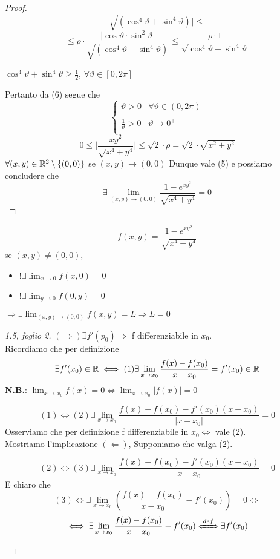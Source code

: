 \begin{exercise}[1b, foglio 2]
\begin{proof}
$$    {\sqrt{\left(\cos^4\vartheta +\sin^4\vartheta\right)}} \rvert \leq$$
    $$\leq \rho\cdot \frac{\lvert \cos\vartheta \cdot \sin^2\vartheta \rvert}{\sqrt{\left(\cos^4\vartheta +\sin^4\vartheta\right)}}
     \leq \frac{\rho \cdot 1}{\sqrt{\cos^4\vartheta + \sin^4\vartheta}}$$
    \begin{exercise}
      $\cos^4\vartheta +\sin^4\vartheta \geq \frac{1}{2}$, $\forall \vartheta \in [0,2\pi]$ 
    \end{exercise}
    Pertanto da (6) segue che $$\left\{\begin{array}{cl}
      \vartheta > 0 & \forall \vartheta \in (0,2\pi) \\ 
      \\
      \frac{1}{\vartheta} > 0 & \vartheta \to 0^{+} \\
    \end{array}\right.$$
    $$0 \leq \lvert \frac{xy^2}{\sqrt{x^4+y^4}} \rvert \leq \sqrt{2}\cdot\rho = \sqrt{2}\cdot\sqrt{x^2+y^2}$$
    $\forall (x,y) \in \mathbb{R}^2 \setminus \{(0,0)\}$ se $(x,y) \to (0,0)$
    Dunque vale (5) e possiamo concludere che $$\exists \lim_{(x,y) \to (0,0)} \frac{1-e^{xy^2}}{\sqrt{x^4+y^4}} = 0$$
  \end{proof}
\end{exercise}
$$f(x,y) = \frac{1-e^{xy^2}}{\sqrt{x^4+y^4}}$$
se $(x,y)\not = (0,0)$, 
\begin{itemize}
  \item $!\exists \lim_{x\to 0} f(x,0) = 0$
  \item $!\exists \lim_{y\to 0} f(0,y) = 0$
\end{itemize}
$\Rightarrow \exists \lim_{(x,y)\to (0,0)}f(x,y) = L \Rightarrow L = 0$
\begin{proof}[1.5, foglio 2]
  $(\Rightarrow) \exists f'(p_0) \Rightarrow $ f \ace differenziabile in $x_0$. \\
  Ricordiamo che per definizione
  $$\exists f'(x_0) \in \mathbb{R} \iff (1) \exists \lim_{x\to x_0} \frac{f(x)-f(x_0)}{x-x_0} = f'(x_0) \in \mathbb{R}$$
  \textbf{N.B.}: $\lim_{x\to x_0} f(x) = 0 \iff \lim_{x\to x_0} \lvert f(x) \rvert= 0$
  \begin{exercise}
    $$(1) \iff (2) \exists \lim_{x\to x_0} \frac{f(x)-f(x_0)-f'(x_0)(x-x_0)}{\lvert x-x_0\rvert} = 0$$
    Osserviamo che per definizione f \ace differenziabile in $x_0 \iff $ vale (2). \\
    Mostriamo l'implicazione $(\Leftarrow)$, Supponiamo che valga (2). 
  \end{exercise}
  \begin{exercise}
    $$(2) \iff (3) \exists \lim_{x\to x_0} \frac{f(x)-f(x_0)-f'(x_0)(x-x_0)}{x-x_0} = 0$$
    \ac{E} chiaro che $$(3) \iff \exists \lim_{x\to x_0}\left(\frac{f(x)-f(x_0)}{x-x_0} - f'(x_0)\right) = 0 \iff$$
    $$\iff \exists \lim_{x\to x_0} \frac{f(x)-f(x_0)}{x-x_0} -f'(x_0) \xLeftrightarrow{def} \exists f'(x_0)$$
  \end{exercise}
\end{proof}